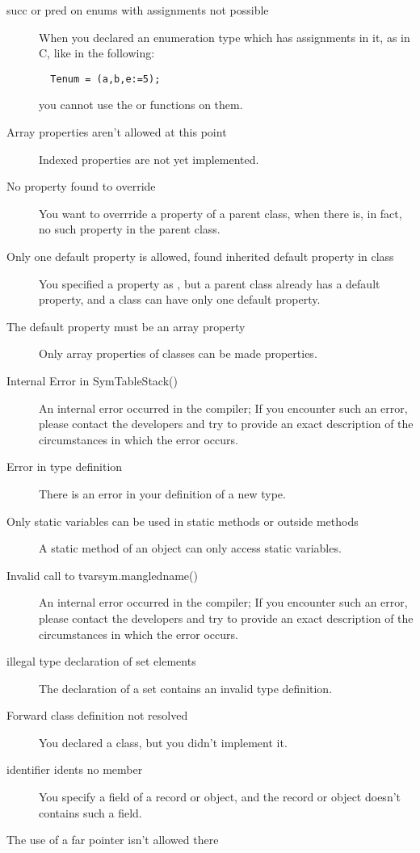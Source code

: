\documentclass{report}
\begin{document}
\begin{description}
\item [ succ or pred on enums with assignments not possible ]
When you declared an enumeration type which has assignments in it, as in C,
like in the following:
\begin{verbatim}
  Tenum = (a,b,e:=5);
\end{verbatim}
you cannot use the  or  functions on them. 
\item [ Array properties aren't allowed at this point ]
Indexed properties are not yet implemented.
\item [ No property found to override ]
You want to overrride a property of a parent class, when there is, in fact,
no such property in the parent class.
\item [ Only one default property is allowed, found inherited default property in class ]
You specified a property as , but a parent class already has a
default property, and a class can have only one default property.
\item [ The default property must be an array property ]
Only array properties of classes can be made  properties. 
\item [ Internal Error in SymTableStack() ]
An internal error occurred in the compiler; If you encounter such an error,
please contact the developers and try to provide  an exact description of
the circumstances in which the error occurs.
\item [ Error in type definition ]
There is an error in your definition of a new type.
\item [ Only static variables can be used in static methods or outside methods ]
A static method of an object can only access static variables.
\item [ Invalid call to tvarsym.mangledname() ]
An internal error occurred in the compiler; If you encounter such an error,
please contact the developers and try to provide  an exact description of
the circumstances in which the error occurs.
\item [ illegal type declaration of set elements ]
The declaration of a set contains an invalid type definition.
\item [ Forward class definition not resolved  ]
You declared a class, but you didn't implement it.
\item [ identifier idents no member ]
You specify a field of a record or object, and the record or object doesn't
contains such a field.
\item [ The use of a far pointer isn't allowed there ]

\end{description}
\end{document}

